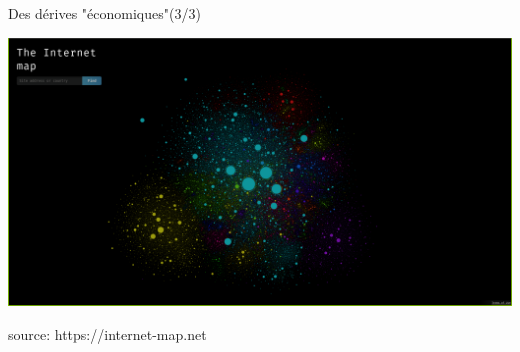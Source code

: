 \begin{frame}{Des dérives "économiques"\hfill(3/3)}
  \begin{center}
    \includegraphics[width=1\textwidth]{usages/internet-map3.png}
  \end{center}
  \footnotesize{\tiny{source: https://internet-map.net}}
\end{frame}

